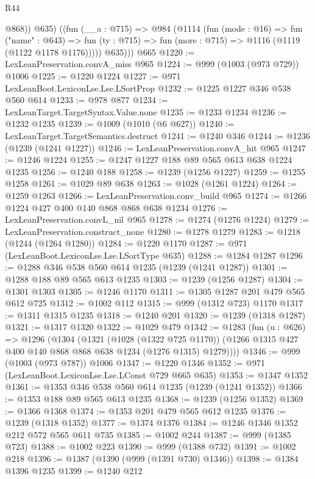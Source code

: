 \begin{lexlean}{R44}
\begin{coremodule}
            @868))
          @635)
        ((fun (__a : @715) =>
        @984
          (@1114
            (fun (mode : @16) =>
            fun ("name" : @643) =>
            fun (ty : @715) => fun (more : @715) => @1116 (@1119 (@1122 @1178 @1176)))))
          @635)))
    @665
@1220 := LexLeanPreservation.convA_miss @965
@1224 := @999 (@1003 (@973 @729)) @1006
@1225 := @1220 @1224
@1227 := @971 LexLeanBoot.LexiconLse.Lse.LSortProp
@1232 := @1225 @1227 @346 @538 @560 @614
@1233 := @978 @877
@1234 := LexLeanTarget.TargetSyntax.Value.none
@1235 := @1233 @1234
@1236 := @1232 @1235
@1239 := @1009 (@1010 (@6 @627))
@1240 := LexLeanTarget.TargetSemantics.destruct
@1241 := @1240 @346
@1244 := @1236 (@1239 (@1241 @1227))
@1246 := LexLeanPreservation.convA_hit @965
@1247 := @1246 @1224
@1255 := @1247 @1227 @188 @89 @565 @613 @638 @1224 @1235
@1256 := @1240 @188
@1258 := @1239 (@1256 @1227)
@1259 := @1255 @1258
@1261 := @1029 @89 @638
@1263 := @1028 (@1261 @1224)
@1264 := @1259 @1263
@1266 := LexLeanPreservation.conv_build @965
@1274 := @1266 @1224 @427 @400 @140 @868 @868 @638 @1234
@1276 := LexLeanPreservation.convL_nil @965
@1278 := @1274 (@1276 @1224)
@1279 := LexLeanPreservation.construct_none
@1280 := @1278 @1279
@1283 := @1218 (@1244 (@1264 @1280))
@1284 := @1220 @1170
@1287 := @971 (LexLeanBoot.LexiconLse.Lse.LSortType @635)
@1288 := @1284 @1287
@1296 := @1288 @346 @538 @560 @614 @1235 (@1239 (@1241 @1287))
@1301 := @1288 @188 @89 @565 @613 @1235
@1303 := @1239 (@1256 @1287)
@1304 := @1301 @1303
@1305 := @1246 @1170
@1311 := @1305 @1287 @201 @479 @565 @612 @725
@1312 := @1002 @112
@1315 := @999 (@1312 @723) @1170
@1317 := @1311 @1315 @1235
@1318 := @1240 @201
@1320 := @1239 (@1318 @1287)
@1321 := @1317 @1320
@1322 := @1029 @479
@1342 := @1283
    (fun (u : @626) =>
    @1296
      (@1304
        (@1321
          (@1028 (@1322 @725 @1170))
          (@1266 @1315 @427 @400 @140 @868 @868 @638 @1234 (@1276 @1315) @1279))))
@1346 := @999 (@1003 (@973 @787)) @1006
@1347 := @1220 @1346
@1352 := @971 (LexLeanBoot.LexiconLse.Lse.LConst @729 @665 @635)
@1353 := @1347 @1352
@1361 := @1353 @346 @538 @560 @614 @1235 (@1239 (@1241 @1352))
@1366 := @1353 @188 @89 @565 @613 @1235
@1368 := @1239 (@1256 @1352)
@1369 := @1366 @1368
@1374 := @1353 @201 @479 @565 @612 @1235
@1376 := @1239 (@1318 @1352)
@1377 := @1374 @1376
@1384 := @1246 @1346 @1352 @212 @572 @565 @611 @735
@1385 := @1002 @244
@1387 := @999 (@1385 @723)
@1388 := @1002 @223
@1390 := @999 (@1388 @732)
@1391 := @1002 @218
@1396 := @1387 (@1390 (@999 (@1391 @730) @1346))
@1398 := @1384 @1396 @1235
@1399 := @1240 @212

\end{coremodule}
\end{lexlean}
